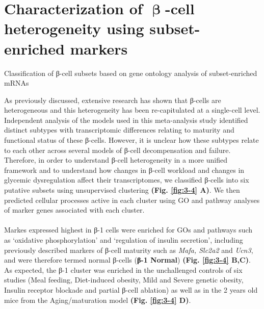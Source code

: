 \clearpage

\section{Characterization of \( \mathbf{\upbeta} \)-cell heterogeneity using subset-\\enriched markers}
Classification of β-cell subsets based on
gene ontology analysis of subset-enriched mRNAs

\label{sec:chp3_betaclustering}
As previously discussed, extensive research has shown that β-cells are heterogeneous and this heterogeneity has been re-capitulated at a single-cell level. Independent analysis of the models used in this meta-analysis study identified distinct subtypes with transcriptomic differences relating to maturity and functional status of these β-cells. However, it is unclear how these subtypes relate to each other across several models of β-cell decompensation and failure. Therefore, in order to understand β-cell heterogeneity in a more unified framework and to understand how changes in β-cell workload and changes in glycemic dysregulation affect their transcriptomes, we classified β-cells into six putative subsets using unsupervised clustering \textbf{(Fig. \ref{fig:3-4} A)}. We then predicted cellular processes active in each cluster using GO and pathway analyses of marker genes associated with each cluster.\\\\
Markes expressed highest in β-1 cells were enriched for GOs and pathways such as `oxidative phosphorylation' and `regulation of insulin secretion', including previously described markers of β-cell maturity such as \textit{Mafa, Slc2a2}  and \textit{Ucn3}, and were therefore termed normal β-cells (\textbf{β-1 Normal}) \textbf{(Fig. \ref{fig:3-4} B,C)}. As expected, the β-1 cluster was enriched in the unchallenged controls of six studies (Meal feeding, Diet-induced obesity, Mild and Severe genetic obesity, Insulin receptor blockade and partial β-cell ablation) as well as in the 2 years old mice from the Aging/maturation model \textbf{(Fig. \ref{fig:3-4} D)}.\\\\
